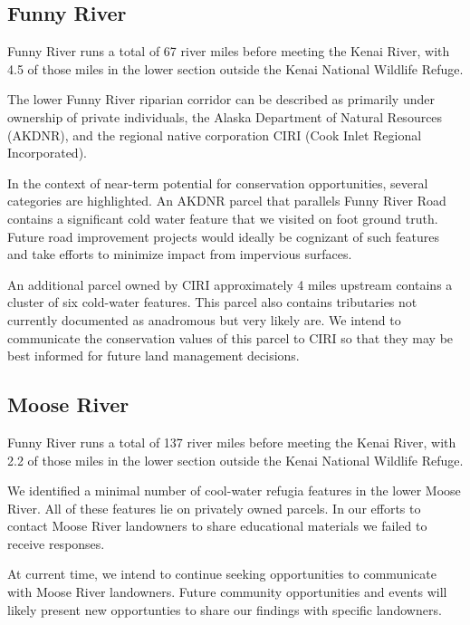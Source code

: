\documentclass[
  letterpaper,
  DIV=11,
  numbers=noendperiod]{scrreprt}
\begin{document}
\hypertarget{funny-river}{%
\subsection{Funny River}\label{funny-river}}

Funny River runs a total of 67 river miles before meeting the Kenai
River, with 4.5 of those miles in the lower section outside the Kenai
National Wildlife Refuge.

The lower Funny River riparian corridor can be described as primarily
under ownership of private individuals, the Alaska Department of Natural
Resources (AKDNR), and the regional native corporation CIRI (Cook Inlet
Regional Incorporated).

In the context of near-term potential for conservation opportunities,
several categories are highlighted. An AKDNR parcel that parallels Funny
River Road contains a significant cold water feature that we visited on
foot ground truth. Future road improvement projects would ideally be
cognizant of such features and take efforts to minimize impact from
impervious surfaces.

An additional parcel owned by CIRI approximately 4 miles upstream
contains a cluster of six cold-water features. This parcel also contains
tributaries not currently documented as anadromous but very likely are.
We intend to communicate the conservation values of this parcel to CIRI
so that they may be best informed for future land management decisions.

\hypertarget{moose-river}{%
\subsection{Moose River}\label{moose-river}}

Funny River runs a total of 137 river miles before meeting the Kenai
River, with 2.2 of those miles in the lower section outside the Kenai
National Wildlife Refuge.

We identified a minimal number of cool-water refugia features in the
lower Moose River. All of these features lie on privately owned parcels.
In our efforts to contact Moose River landowners to share educational
materials we failed to receive responses.

At current time, we intend to continue seeking opportunities to
communicate with Moose River landowners. Future community opportunities
and events will likely present new opportunties to share our findings
with specific landowners.
\end{document}
